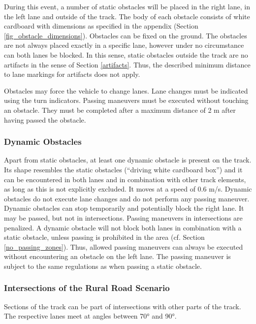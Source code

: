During this event, a number of static obstacles will be placed in the right
lane, in the left lane and outside of the track. The body of each obstacle
consists of white cardboard with dimensions as specified in the appendix
(Section \ref{fig_obstacle_dimensions}). Obstacles can be fixed on the ground.
The obstacles are not always placed exactly in a specific lane, however under
no circumstance can both lanes be blocked. In this sense, static obstacles
outside the track are no artifacts in the sense of Section \ref{artifacts}.
Thus, the described minimum distance to lane markings for artifacts does not
apply.

Obstacles may force the vehicle to change lanes. Lane changes must be indicated
using the turn indicators. Passing maneuvers must be executed without touching
an obstacle. They must be completed after a maximum distance of 2 m after
having passed the obstacle.

\subsubsection{Dynamic Obstacles}

Apart from static obstacles, at least one dynamic obstacle is present on the
track. Its shape resembles the static obstacles (“driving white cardboard box”)
and it can be encountered in both lanes and in combination with other track
elements, as long as this is not explicitly excluded. It moves at a speed of
0.6 m/s. Dynamic obstacles do not execute lane changes and do not perform any
passing maneuver. Dynamic obstacles can stop temporarily and potentially block
the right lane. It may be passed, but not in intersections. Passing maneuvers
in intersections are penalized. A dynamic obstacle will not block both lanes in
combination with a static obstacle, unless passing is prohibited in the area
(cf. Section \ref{no_passing_zones}). Thus, allowed passing maneuvers can
always be executed without encountering an obstacle on the left lane. The
passing maneuver is subject to the same regulations as when passing a static
obstacle.

\subsubsection{Intersections of the Rural Road Scenario}
\label{intersection_rural}

Sections of the track can be part of intersections with other parts of the
track. The respective lanes meet at angles between 70° and 90°.

